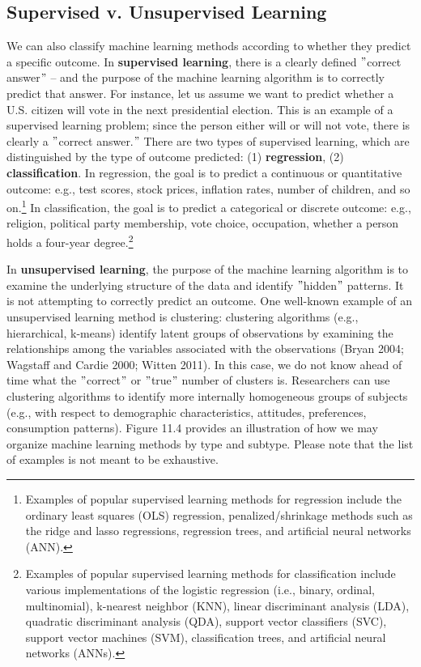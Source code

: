\documentclass{book}
\begin{document}
\hypertarget{supervised-v.-unsupervised-learning}{%
\subsection{Supervised v. Unsupervised
Learning}\label{supervised-v.-unsupervised-learning}}

We can also classify machine learning methods according to whether they
predict a specific outcome. In \textbf{supervised learning}, there is a
clearly defined \("\)correct answer\("\) -- and the purpose of the machine
learning algorithm is to correctly predict that answer. For instance, let us
assume we want to predict whether a U.S. citizen will vote in the next
presidential election. This is an example of a supervised learning problem;
since the person either will or will not vote, there is clearly a \("\)correct
answer.\("\) There are two types of supervised learning, which are
distinguished by the type of outcome predicted: (1) \textbf{regression}, (2)
\textbf{classification}. In regression, the goal is to predict a continuous or
quantitative outcome: e.g., test scores, stock prices, inflation rates, number
of children, and so on.\footnote{Examples of popular supervised learning
  methods for regression include the ordinary least squares (OLS) regression,
  penalized/shrinkage methods such as the ridge and lasso regressions,
  regression trees, and artificial neural networks (ANN).} In classification,
the goal is to predict a categorical or discrete outcome: e.g., religion,
political party membership, vote choice, occupation, whether a person holds a
four-year degree.\footnote{Examples of popular supervised learning methods for
  classification include various implementations of the logistic regression
  (i.e., binary, ordinal, multinomial), k-nearest neighbor (KNN), linear
  discriminant analysis (LDA), quadratic discriminant analysis (QDA), support
  vector classifiers (SVC), support vector machines (SVM), classification
  trees, and artificial neural networks (ANNs).}

In \textbf{unsupervised learning}, the purpose of the machine learning
algorithm is to examine the underlying structure of the data and identify
\("\)hidden\("\) patterns. It is not attempting to correctly predict an
outcome. One well-known example of an unsupervised learning method is
clustering: clustering algorithms (e.g., hierarchical, k-means) identify
latent groups of observations by examining the relationships among the
variables associated with the observations (Bryan 2004; Wagstaff and Cardie
2000; Witten 2011). In this case, we do not know ahead of time what the
\("\)correct\("\) or \("\)true\("\) number of clusters is. Researchers can use
clustering algorithms to identify more internally homogeneous groups of
subjects (e.g., with respect to demographic characteristics, attitudes,
preferences, consumption patterns). Figure 11.4 provides an illustration of
how we may organize machine learning methods by type and subtype. Please note
that the list of examples is not meant to be exhaustive.
\end{document}
